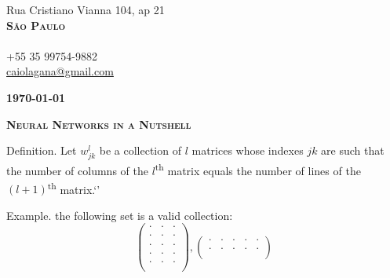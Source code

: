 \documentclass[twoside]{letter}
\begin{document}
\justifying

\parbox{\linewidth}
{
\begin{flushright}
Rua Cristiano Vianna 104, ap 21\\
\textbf{\textsc{São Paulo}}\\
\mbox{}\\
+55 35 99754-9882\\
\href{mailto:caiolagana@gmail.com}{caiolagana@gmail.com}
\end{flushright}
}

\textbf{\today}


\vspace{2em}

\begin{center}\textsc{\Large \textbf{Neural Networks in a Nutshell}}\end{center}

Definition. Let $w^l_{jk}$ be a collection of $l$ matrices whose indexes $jk$ are such that the number of columns of the $l$\textsuperscript{th} matrix equals the number of lines of the $(l+1)$\textsuperscript{th} matrix.`'


Example. the following set is a valid collection:
\[
    \begin{pmatrix}
    \cdot & \cdot & \cdot \\
    \cdot & \cdot & \cdot \\
    \cdot & \cdot & \cdot \\
    \cdot & \cdot & \cdot \\
    \cdot & \cdot & \cdot \\
    \end{pmatrix}
    ,
    \begin{pmatrix}
    \cdot & \cdot & \cdot & \cdot & \cdot \\
    \cdot & \cdot & \cdot & \cdot & \cdot \\
    \end{pmatrix}
\]
\end{document}
